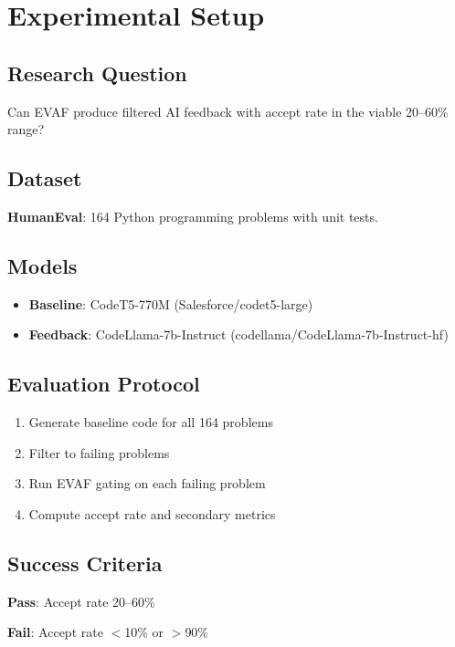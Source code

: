 \section{Experimental Setup}
\label{sec:experiments}

\subsection{Research Question}

Can EVAF produce filtered AI feedback with accept rate in the viable 20--60\% range?

\subsection{Dataset}

\textbf{HumanEval}: 164 Python programming problems with unit tests.

\subsection{Models}

\begin{itemize}
    \item \textbf{Baseline}: CodeT5-770M (Salesforce/codet5-large)
    \item \textbf{Feedback}: CodeLlama-7b-Instruct (codellama/CodeLlama-7b-Instruct-hf)
\end{itemize}

\subsection{Evaluation Protocol}

\begin{enumerate}
    \item Generate baseline code for all 164 problems
    \item Filter to failing problems
    \item Run EVAF gating on each failing problem
    \item Compute accept rate and secondary metrics
\end{enumerate}

\subsection{Success Criteria}

\textbf{Pass}: Accept rate 20--60\%

\textbf{Fail}: Accept rate $<$10\% or $>$90\%
